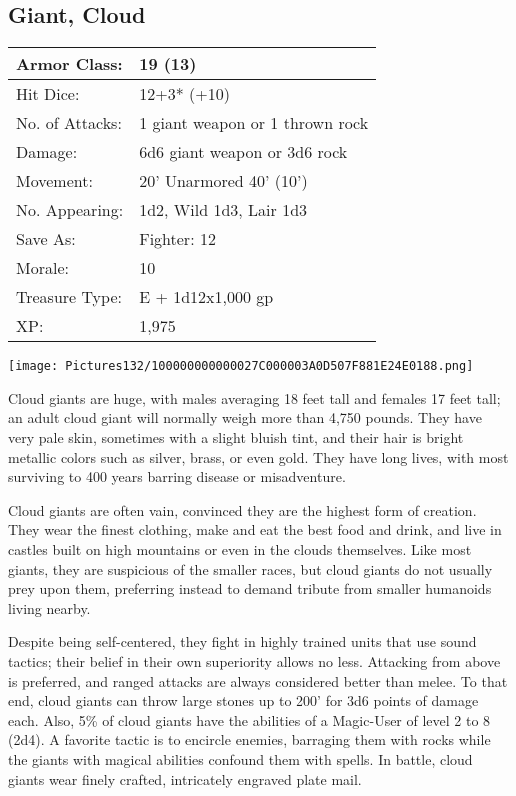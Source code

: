 \documentclass[a4paper,twoside,openany,10pt]{book}
\begin{document}
\begin{multicols}{2}
	



\subsection*{Giant, Cloud}\label{giant-cloud}

\begin{tabularx}{0.48\textwidth}{@{}lX@{}}
Armor Class: & 19 (13) \\\hline
Hit Dice: & 12+3* (+10) \\\hline
No. of Attacks: & 1 giant weapon or 1 thrown rock \\\hline
Damage: & 6d6 giant weapon or 3d6 rock \\\hline
Movement: & 20' Unarmored 40'
(10') \\\hline
No. Appearing: & 1d2, Wild 1d3, Lair 1d3 \\\hline
Save As: & Fighter: 12 \\\hline
Morale: & 10 \\\hline
Treasure Type: & E + 1d12x1,000 gp \\\hline
XP: & 1,975 \\\hline
\end{tabularx}\medskip


\begin{center}
	\texttt{[image: Pictures132/100000000000027C000003A0D507F881E24E0188.png]}
\end{center}

Cloud giants are huge, with males averaging 18 feet tall and females 17 feet tall; an adult cloud giant will normally weigh more than 4,750 pounds. They have very pale skin, sometimes with a slight bluish tint, and their hair is bright metallic colors such as silver, brass, or even gold. They have long lives, with most surviving to 400 years barring disease or misadventure.

Cloud giants are often vain, convinced they are the highest form of creation. They wear the finest clothing, make and eat the best food and drink, and live in castles built on high mountains or even in the clouds themselves. Like most giants, they are suspicious of the smaller races, but cloud giants do not usually prey upon them, preferring instead to demand tribute from smaller humanoids living nearby.

Despite being self-centered, they fight in highly trained units that use sound tactics; their belief in their own superiority allows no less. Attacking from above is preferred, and ranged attacks are always considered better than melee. To that end, cloud giants can throw large stones up to 200' for 3d6 points of damage each. Also, 5\% of cloud giants have the abilities of a Magic-User of level 2 to 8 (2d4). A favorite tactic is to encircle enemies, barraging them with rocks while the giants with magical abilities confound them with spells. In battle, cloud giants wear finely crafted, intricately engraved plate mail.



\end{multicols}
\end{document}
